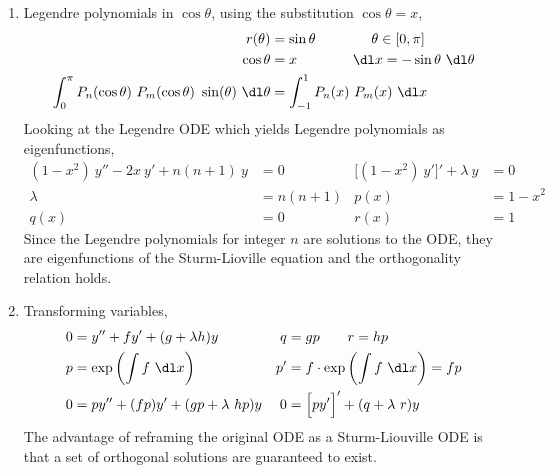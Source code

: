 \begin{enumerate}
    \item Legendre polynomials in $ \cos \theta $, using the substitution
          $ \cos \theta = x $,
          \begin{align}
              r(\theta)                & = \sin \theta \qquad\qquad
              \theta \in [0, \pi]                                   \\
              \cos \theta              & = x \qquad\qquad
              \dl x = -\sin \theta\ \dl \theta                      \\
              \int_{0}^{\pi} P_n(\cos \theta)\ P_m(\cos \theta)\
              \sin(\theta)\ \dl \theta &
              = \int_{-1}^{1} P_n(x)\ P_m(x)\ \dl x
          \end{align}
          Looking at the Legendre ODE which yields Legendre polynomials as
          eigenfunctions,
          \begin{align}
              (1 - x^2)\ y'' - 2x\ y' + n(n+1)\ y   & = 0       &
              \Big[(1 - x^2)\ y'\Big]' + \lambda\ y & = 0         \\
              \lambda                               & = n(n+1)  &
              p(x)                                  & = 1 - x^2   \\
              q(x)                                  & = 0       &
              r(x)                                  & = 1
          \end{align}
          Since the Legendre polynomials for integer $ n $ are solutions to the ODE,
          they are eigenfunctions of the Sturm-Lioville equation and the orthogonality
          relation holds.

    \item Transforming variables,
          \begin{align}
              0  & = y'' + fy' + (g + \lambda h)y                  &
              q  & = gp \qquad r = hp                                \\
              p  & = \exp\left( \int f\ \dl x \right)              &
              p' & = f \cdot \exp\left( \int f\ \dl x \right) = fp   \\
              0  & = py'' + (fp)y' + (gp + \lambda\ hp)y           &
              0  & = \Big[py'\Big]' + (q + \lambda\ r) y
          \end{align}
          The advantage of reframing the original ODE as a Sturm-Liouville ODE is that
          a set of orthogonal solutions are guaranteed to exist.


\end{enumerate}
